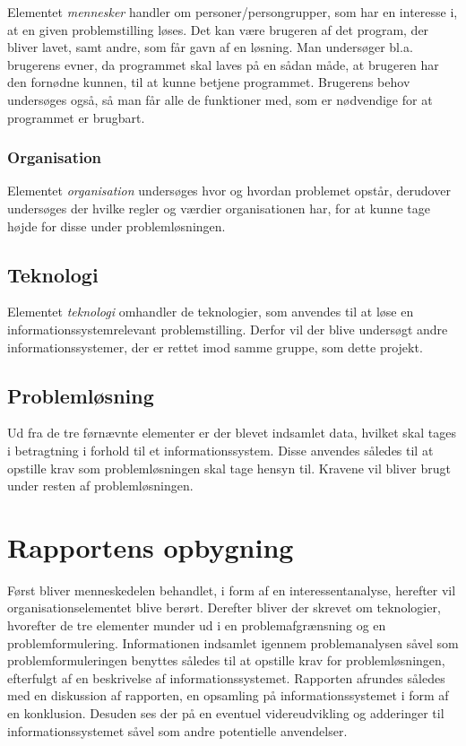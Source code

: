Elementet \textit{mennesker} handler om personer/persongrupper, som har en interesse i, at en given problemstilling løses.
Det kan være brugeren af det program, der bliver lavet, samt andre, som får gavn af en løsning.
Man undersøger bl.a. brugerens evner, da programmet skal laves på en sådan måde, at brugeren har den fornødne kunnen, til at kunne betjene programmet.
Brugerens behov undersøges også, så man får alle de funktioner med, som er nødvendige for at programmet er brugbart.


\subsubsection{Organisation}\label{subsec:organisation}

Elementet \textit{organisation} undersøges hvor og hvordan problemet opstår, derudover undersøges der hvilke regler og værdier organisationen har, for at kunne tage højde for disse under problemløsningen.


\subsection{Teknologi}\label{subsec:Teknologi}

Elementet \textit{teknologi} omhandler de teknologier, som anvendes til at løse en informationssystemrelevant problemstilling.
Derfor vil der blive undersøgt andre informationssystemer, der er rettet imod samme gruppe, som dette projekt.


\subsection{Problemløsning}
Ud fra de tre førnævnte elementer er der blevet indsamlet data, hvilket skal tages i betragtning i forhold til et informationssystem.
Disse anvendes således til at opstille krav som problemløsningen skal tage hensyn til.
Kravene vil bliver brugt under resten af problemløsningen.


\section{Rapportens opbygning}\label{sec:rapportens-opbygning}

Først bliver menneskedelen behandlet, i form af en interessentanalyse, herefter vil organisationselementet blive berørt.
Derefter bliver der skrevet om teknologier, hvorefter de tre elementer munder ud i en problemafgrænsning og en problemformulering.
Informationen indsamlet igennem problemanalysen såvel som problemformuleringen benyttes således til at opstille krav for problemløsningen, efterfulgt af en beskrivelse af informationssystemet.
Rapporten afrundes således med en diskussion af rapporten, en opsamling på informationssystemet i form af en konklusion. Desuden ses der på en eventuel videreudvikling og adderinger til informationssystemet såvel som andre potentielle anvendelser.